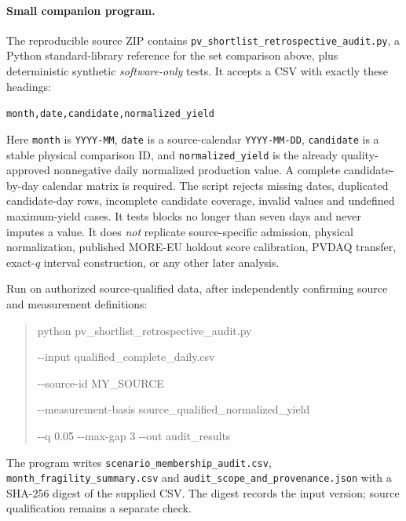 \documentclass[11pt]{article}
\begin{document}
\paragraph{Small companion program.}
The reproducible source ZIP contains \nolinkurl{pv_shortlist_retrospective_audit.py}, a Python standard-library reference for the set comparison above, plus deterministic synthetic \emph{software-only} tests. It accepts a CSV with exactly these headings:
\begin{center}\small\texttt{month,date,candidate,normalized\_yield}\end{center}
Here \texttt{month} is \texttt{YYYY-MM}, \texttt{date} is a source-calendar \texttt{YYYY-MM-DD}, \texttt{candidate} is a stable physical comparison ID, and \texttt{normalized\_yield} is the already quality-approved nonnegative daily normalized production value. A complete candidate-by-day calendar matrix is required. The script rejects missing dates, duplicated candidate-day rows, incomplete candidate coverage, invalid values and undefined maximum-yield cases. It tests blocks no longer than seven days and never imputes a value. It does \emph{not} replicate source-specific admission, physical normalization, published MORE-EU holdout score calibration, PVDAQ transfer, exact-$q$ interval construction, or any other later analysis.

Run on authorized source-qualified data, after independently confirming source and measurement definitions:
\begin{quote}\small\ttfamily
python pv\_shortlist\_retrospective\_audit.py

\hspace*{1em}-{}-input qualified\_complete\_daily.csv

\hspace*{1em}-{}-source-id MY\_SOURCE

\hspace*{1em}-{}-measurement-basis source\_qualified\_normalized\_yield

\hspace*{1em}-{}-q 0.05 -{}-max-gap 3 -{}-out audit\_results
\end{quote}
The program writes \nolinkurl{scenario_membership_audit.csv}, \nolinkurl{month_fragility_summary.csv} and \nolinkurl{audit_scope_and_provenance.json} with a SHA-256 digest of the supplied CSV. The digest records the input version; source qualification remains a separate check.
\end{document}
